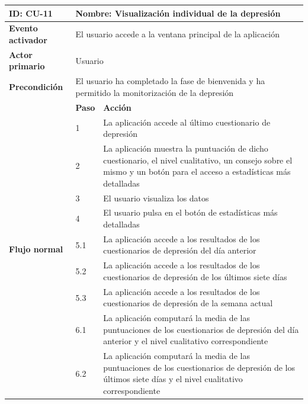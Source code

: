             \begin{table}[h]
                \centering
                \begin{tabularx}{\textwidth}{|l|l|X|}
                    \hline
                    \textbf{ID:} CU-11 & \multicolumn{2}{|X|}{\textbf{Nombre}: Visualización individual de la depresión} \\
                    \hline
                    \textbf{Evento activador} & \multicolumn{2}{|X|}{El usuario accede a la ventana principal de la aplicación} \\
                    \hline
                    \textbf{Actor primario} & \multicolumn{2}{|X|}{Usuario} \\
                    \hline
                    \textbf{Precondición} & \multicolumn{2}{|X|}{El usuario ha completado la fase de bienvenida y ha permitido la monitorización de la depresión} \\
                    \hline
                    \multirow{13}{*}{\textbf{Flujo normal}} & \textbf{Paso} & \textbf{Acción} \\
                    \cline{2-3} & 1 & La aplicación accede al último cuestionario de depresión \\
                    \cline{2-3} & 2 & La aplicación muestra la puntuación de dicho cuestionario, el nivel cualitativo, un consejo sobre el mismo y un botón para el acceso a estadísticas más detalladas \\
                    \cline{2-3} & 3 & El usuario visualiza los datos \\
                    \cline{2-3} & 4 & El usuario pulsa en el botón de estadísticas más detalladas \\
                    \cline{2-3} & 5.1 & La aplicación accede a los resultados de los cuestionarios de depresión del día anterior \\
                    \cline{2-3} & 5.2 & La aplicación accede a los resultados de los cuestionarios de depresión de los últimos siete días \\
                    \cline{2-3} & 5.3 & La aplicación accede a los resultados de los cuestionarios de depresión de la semana actual \\
                    \cline{2-3} & 6.1 & La aplicación computará la media de las puntuaciones de los cuestionarios de depresión del día anterior y el nivel cualitativo correspondiente \\
                    \cline{2-3} & 6.2 & La aplicación computará la media de las puntuaciones de los cuestionarios de depresión de los últimos siete días y el nivel cualitativo correspondiente \\

\end{tabularx}
\end{table}
